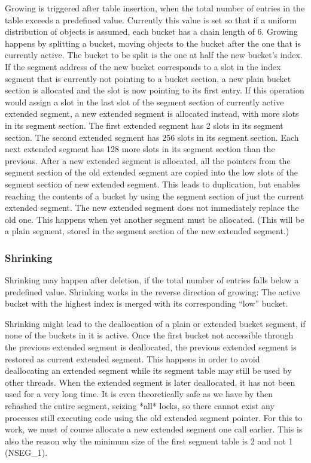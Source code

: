 \documentclass[aps,pre,preprint,nofootinbib]{revtex4}
\begin{document}
Growing is triggered after table insertion, when the total number of entries in the table exceeds a predefined value.
Currently this value is set so that if a uniform distribution of objects is assumed, each bucket has a chain length of 6.
Growing happens by splitting a bucket, moving objects to the bucket after the one that is currently active.
The bucket to be split is the one at half the new bucket's index.
If the segment address of the new bucket corresponds to a slot in the index segment that is currently not pointing to a bucket section, a new plain bucket section is allocated and the slot is now pointing to its first entry.
If this operation would assign a slot in the last slot of the segment section of currently active extended segment, a new extended segment is allocated instead, with more slots in its segment section.
The first extended segment has 2 slots in its segment section.
The second extended segment has 256 slots in its segment section.
Each next extended segment has 128 more slots in its segment section than the previous.
After a new extended segment is allocated, all the pointers from the segment section of the old extended segment are copied into the low slots of the segment section of new extended segment.
This leads to duplication, but enables reaching the contents of a bucket by using the segment section of just the current extended segment.
The new extended segment does not immediately replace the old one.
This happens when yet another segment must be allocated.
(This will be a plain segment, stored in the segment section of the new extended segment.)

\subsubsection{Shrinking}

Shrinking may happen after deletion, if the total number of entries falls below a predefined value.
Shrinking works in the reverse direction of growing:
The active bucket with the highest index is merged with its corresponding ``low'' bucket.

Shrinking might lead to the deallocation of a plain or extended bucket segment, if none of the buckets in it is active.
Once the first bucket not accessible through the previous extended segment is deallocated, the previous extended segment is restored as current extended segment.
This happens in order to avoid deallocating an extended segment while its segment table may still be used by other threads.
When the extended segment is later deallocated, it has not been used for a very long time.
It is even theoretically safe as we have by then rehashed the entire segment, seizing *all* locks, so there cannot exist any processes still executing code using the old extended segment pointer.
For this to work, we must of course allocate a new extended segment one call earlier.
This is also the reason why the minimum size of the first segment table is 2 and not 1 (NSEG\_1).
\end{document}
